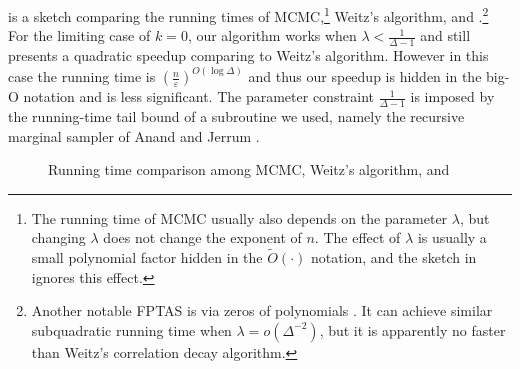 \documentclass[10pt,a4paper]{article}
\newcommand{\eps}{\varepsilon}
\begin{document}
 is a sketch comparing the running times of MCMC,\footnote{The running time of MCMC usually also depends on the parameter $\lambda$, but changing $\lambda$ does not change the exponent of $n$. The effect of $\lambda$ is usually a small polynomial factor hidden in the $\widetilde{O}(\cdot)$ notation, and the sketch in  ignores this effect.} Weitz's algorithm, and .\footnote{Another notable FPTAS is via zeros of polynomials \cite{Bar16,PR17}. It can achieve similar subquadratic running time when $\lambda=o(\Delta^{-2})$, but it is apparently no faster than Weitz's correlation decay algorithm.}
For the limiting case of $k=0$, our algorithm works when $\lambda<\frac{1}{\Delta-1}$ and still presents a quadratic speedup comparing to Weitz's algorithm.
However in this case the running time is $\left( \frac{n}{\eps} \right)^{O(\log \Delta)}$ and thus our speedup is hidden in the big-O notation and is less significant.
The parameter constraint $\frac{1}{\Delta-1}$ is imposed by the running-time tail bound of a subroutine we used, namely the recursive marginal sampler of Anand and Jerrum \cite{AJ22}.


\begin{figure}[!htbp]
  \centering
  \caption{Running time comparison among MCMC, Weitz's algorithm, and }
  \label{fig:run-time}
\end{figure}
\end{document}
